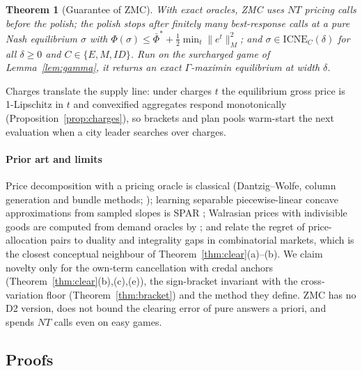 \documentclass[preprint,11pt]{elsarticle}
\newtheorem{theorem}{Theorem}
\theoremstyle{definition}
\theoremstyle{remark}
\newcommand{\ICNE}{\mathrm{ICNE}}
\begin{document}
\begin{theorem}[Guarantee of ZMC]\label{thm:zmc}
With exact oracles, ZMC uses $NT$ pricing calls before the polish; the polish stops after finitely many best-response calls at a pure Nash equilibrium $\sigma$ with $\Phi(\sigma)\le\bar\Phi^*+\tfrac12\min_t\|e^t\|_M^2$; and $\sigma\in\ICNE_C(\delta)$ for all $\delta\ge0$ and $C\in\{E,M,ID\}$. Run on the surcharged game of Lemma~\ref{lem:gamma}, it returns an exact $\Gamma$-maximin equilibrium at width $\delta$.
\end{theorem}

Charges translate the supply line: under charges $t$ the equilibrium gross price is 1-Lipschitz in $t$ and convexified aggregates respond monotonically (Proposition~\ref{prop:charges}), so brackets and plan pools warm-start the next evaluation when a city leader searches over charges.

\paragraph{Prior art and limits} Price decomposition with a pricing oracle is classical (Dantzig--Wolfe, column generation and bundle methods; \citealp{Briant2008}); learning separable piecewise-linear concave approximations from sampled slopes is SPAR \citep{Powell2004}; Walrasian prices with indivisible goods are computed from demand oracles by \citet{PaesLeme2020}; and \citet{Duguet2025} relate the regret of price-allocation pairs to duality and integrality gaps in combinatorial markets, which is the closest conceptual neighbour of Theorem~\ref{thm:clear}(a)--(b). We claim novelty only for the own-term cancellation with credal anchors (Theorem~\ref{thm:clear}(b),(c),(e)), the sign-bracket invariant with the cross-variation floor (Theorem~\ref{thm:bracket}) and the method they define. ZMC has no D2 version, does not bound the clearing error of pure answers a priori, and spends $NT$ calls even on easy games.

\subsection*{Proofs}
\end{document}
